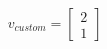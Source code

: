 \documentclass[preview]{standalone}
\begin{document}
\begin{align*}
v_{custom} = \begin{bmatrix} 2 \\ 1 \end{bmatrix}
\end{align*}
\end{document}
